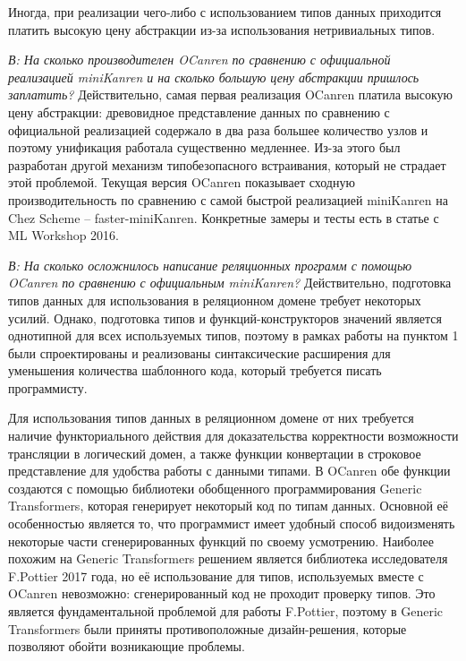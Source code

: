 Иногда, при реализации чего-либо с использованием типов данных приходится платить высокую цену абстракции из-за использования нетривиальных типов.

\emph{В: На сколько производителен OCanren по сравнению с официальной реализацией miniKanren и на сколько большую цену абстракции пришлось заплатить?}
Действительно, самая первая реализация OCanren платила высокую цену абстракции: древовидное представление данных по сравнению с официальной реализацией содержало в два раза большее количество узлов и поэтому унификация работала существенно медленнее. Из-за этого был разработан другой механизм типобезопасного встраивания, который не страдает этой проблемой. Текущая версия OCanren показывает сходную производительность по сравнению с самой быстрой реализацией miniKanren на Chez Scheme -- faster-miniKanren. Конкретные замеры и тесты есть в статье с ML Workshop 2016.

\emph{В: На сколько осложнилось написание реляционных программ с помощью OCanren по сравнению с официальным miniKanren?}
Действительно, подготовка типов данных для использования в реляционном домене требует некоторых усилий. Однако, подготовка типов и функций-конструкторов значений является однотипной для всех используемых типов, поэтому в рамках работы на пунктом 1 были спроектированы и реализованы синтаксические расширения для уменьшения количества шаблонного кода, который требуется писать программисту.

Для использования типов данных в реляционном домене от них требуется наличие функториального действия для доказательства корректности возможности трансляции в логический домен, а также функции конвертации в строковое представление для удобства работы с данными типами. В OCanren обе функции создаются с помощью библиотеки обобщенного программирования Generic Transformers, которая генерирует некоторый код по типам данных. Основной её особенностью является то, что программист имеет удобный способ видоизменять некоторые части сгенерированных функций по своему усмотрению. Наиболее похожим на Generic Transformers решением является библиотека исследователя F.Pottier 2017 года, но её использование для типов, используемых вместе с OCanren невозможно: сгенерированный код не проходит проверку типов. Это является фундаментальной проблемой для работы F.Pottier, поэтому в Generic Transformers были приняты противоположные дизайн-решения, которые позволяют обойти возникающие проблемы.

